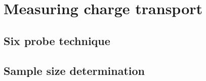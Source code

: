 
\section{Measuring charge transport}

\subsection{Six probe technique}

\subsection{Sample size determination}

